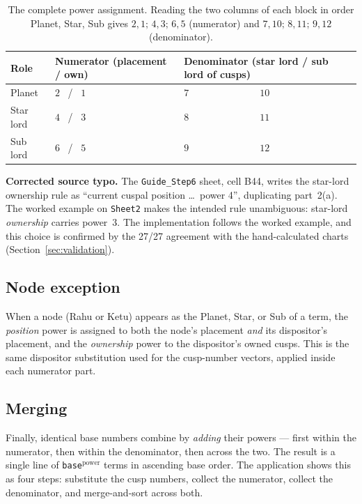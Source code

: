 \documentclass[11pt, a4paper]{article}
\newcommand{\code}[1]{\texttt{#1}}
\begin{document}
\begin{table}[htbp]
  \centering
  \caption{The complete power assignment. Reading the two columns of each
  block in order Planet, Star, Sub gives $2,1;\,4,3;\,6,5$ (numerator) and
  $7,10;\,8,11;\,9,12$ (denominator).}
  \label{tab:powers}
  \begin{tabularx}{\textwidth}{l l l l}
    \toprule
    Role & Numerator (placement / own) & \multicolumn{2}{l}{Denominator (star lord / sub lord of cusps)} \\
    \midrule
    Planet    & $2$ \ / \ $1$ & $7$  & $10$ \\
    Star lord & $4$ \ / \ $3$ & $8$  & $11$ \\
    Sub lord  & $6$ \ / \ $5$ & $9$  & $12$ \\
    \bottomrule
  \end{tabularx}
\end{table}

\begin{warnbox}
\textbf{Corrected source typo.} The \code{Guide\_Step6} sheet, cell B44, writes
the star-lord ownership rule as ``current cuspal position \ldots\ power 4'',
duplicating part~2(a). The worked example on \code{Sheet2} makes the intended
rule unambiguous: star-lord \emph{ownership} carries power~3. The
implementation follows the worked example, and this choice is confirmed by the
27/27 agreement with the hand-calculated charts (Section~\ref{sec:validation}).
\end{warnbox}

\subsection{Node exception}

When a node (Rahu or Ketu) appears as the Planet, Star, or Sub of a term, the
\emph{position} power is assigned to both the node's placement \emph{and} its
dispositor's placement, and the \emph{ownership} power to the dispositor's
owned cusps. This is the same dispositor substitution used for the cusp-number
vectors, applied inside each numerator part.

\subsection{Merging}

Finally, identical base numbers combine by \emph{adding} their powers --- first
within the numerator, then within the denominator, then across the two. The
result is a single line of \code{base}$^{\text{power}}$ terms in ascending base
order. The application shows this as four steps: substitute the cusp numbers,
collect the numerator, collect the denominator, and merge-and-sort across both.
\end{document}
